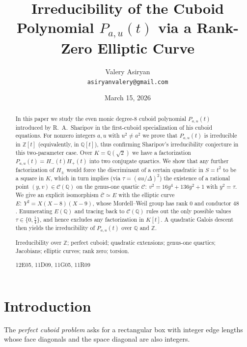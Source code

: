 \documentclass[12pt]{article}
\title{Irreducibility of the Cuboid Polynomial $P_{a,u}(t)$ via a Rank-Zero Elliptic Curve}
\author{Valery Asiryan\\[3pt]
\small \texttt{asiryanvalery@gmail.com}}
\date{\small March 15, 2026}
\theoremstyle{remark}
\theoremstyle{definition}
\begin{document}
\maketitle


\begin{abstract}
In this paper we study the even monic degree-8 cuboid polynomial \(P_{a,u}(t)\) introduced by R.~A.~Sharipov in the first-cuboid specialization of his cuboid equations. For nonzero integers \(a,u\) with \(u^2\neq a^2\) we prove that \(P_{a,u}(t)\) is irreducible in \(\mathbb{Z}[t]\) (equivalently, in \(\mathbb{Q}[t]\)), thus confirming Sharipov's irreducibility conjecture in this two-parameter case. Over \(K=\mathbb{Q}(\sqrt2)\) we have a factorization \(P_{a,u}(t)=H_-(t)H_+(t)\) into two conjugate quartics. We show that any further factorization of \(H_\pm\) would force the discriminant of a certain quadratic in \(S=t^2\) to be a square in \(K\), which in turn implies (via \(\tau=(au/\Delta)^2\)) the existence of a rational point \((y,v)\in\mathcal{C}(\mathbb{Q})\) on the genus-one quartic \(\mathcal{C}:\ v^2=16y^4+136y^2+1\) with \(y^2=\tau\). We give an explicit isomorphism \(\overline{\mathcal{C}}\simeq E\) with the elliptic curve \(E:\ Y^2=X(X-8)(X-9)\), whose Mordell--Weil group has rank \(0\) and conductor \(48\). Enumerating \(E(\mathbb{Q})\) and tracing back to \(\mathcal{C}(\mathbb{Q})\) rules out the only possible values \(\tau\in\{0,\tfrac14\}\), and hence excludes any factorization in \(K[t]\). A quadratic Galois descent then yields the irreducibility of \(P_{a,u}(t)\) over \(\mathbb{Q}\) and \(\mathbb{Z}\).

\medskip
{}
Irreducibility over $\mathbb{Z}$; perfect cuboid; quadratic extensions; genus-one quartics; Jacobians; elliptic curves; rank zero; torsion.

\smallskip
{} 12E05, 11D09, 11G05, 11R09
\end{abstract}


\section{Introduction}\label{sec:intro}
The \emph{perfect cuboid problem} asks for a rectangular box with integer edge lengths whose face diagonals and the space diagonal are also integers.
\end{document}
